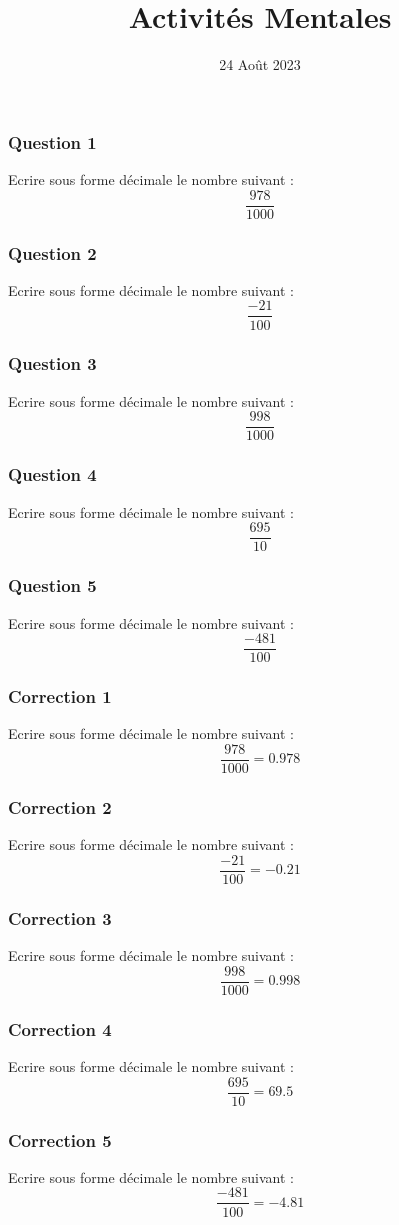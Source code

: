 \documentclass[15pt, mathserif]{beamer}
\title{Activités Mentales}
\date{24 Août 2023}
\begin{document}
\begin{frame}
    \titlepage
\end{frame}

\begin{frame} 
	\frametitle{Question 1}
Ecrire sous forme décimale le nombre suivant : $$ \dfrac{978}{1000}  $$\end{frame}


\begin{frame} 
	\frametitle{Question 2}
Ecrire sous forme décimale le nombre suivant : $$ \dfrac{-21}{100}  $$\end{frame}


\begin{frame} 
	\frametitle{Question 3}
Ecrire sous forme décimale le nombre suivant : $$ \dfrac{998}{1000}  $$\end{frame}


\begin{frame} 
	\frametitle{Question 4}
Ecrire sous forme décimale le nombre suivant : $$ \dfrac{695}{10}  $$\end{frame}


\begin{frame} 
	\frametitle{Question 5}
Ecrire sous forme décimale le nombre suivant : $$ \dfrac{-481}{100}  $$\end{frame}


\begin{frame}
\vspace{-10mm}
	\frametitle{Correction 1}
Ecrire sous forme décimale le nombre suivant : $$ \dfrac{978}{1000} =0.978$$\end{frame}


\begin{frame}
\vspace{-10mm}
	\frametitle{Correction 2}
Ecrire sous forme décimale le nombre suivant : $$ \dfrac{-21}{100} =-0.21$$\end{frame}


\begin{frame}
\vspace{-10mm}
	\frametitle{Correction 3}
Ecrire sous forme décimale le nombre suivant : $$ \dfrac{998}{1000} =0.998$$\end{frame}


\begin{frame}
\vspace{-10mm}
	\frametitle{Correction 4}
Ecrire sous forme décimale le nombre suivant : $$ \dfrac{695}{10} =69.5$$\end{frame}


\begin{frame}
\vspace{-10mm}
	\frametitle{Correction 5}
Ecrire sous forme décimale le nombre suivant : $$ \dfrac{-481}{100} =-4.81$$\end{frame}
\end{document}
